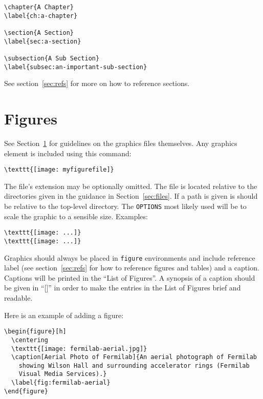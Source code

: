 \begin{verbatim}
\chapter{A Chapter}
\label{ch:a-chapter}

\section{A Section}
\label{sec:a-section}

\subsection{A Sub Section}
\label{subsec:an-important-sub-section}
\end{verbatim}

See section~\ref{sec:refs} for more on how to reference sections.


\section{Figures}
\label{sec:figures}

See Section~\ref{sec:figures} for guidelines on the graphics files themselves.
Any graphics element is included using this command:

\begin{verbatim}
\texttt{[image: myfigurefile]}
\end{verbatim}

The file's extension may be optionally omitted.
The file is located relative to the directories given in the guidance in Section~\ref{sec:files}.  If a path is given is should be relative to the top-level directory.
The \texttt{OPTIONS} most likely used will be to scale the graphic to
a sensible size.  Examples:

\begin{verbatim}
\texttt{[image: ...]}
\texttt{[image: ...]}
\end{verbatim}

Graphics should always be placed in \texttt{figure} environments and include reference label (see
section~\ref{sec:refs} for how to reference figures and tables) and a
caption.  Captions will be printed in the ``List of Figures''.  A
synopsis of a caption should be given in ``[]'' in order to make the
entries in the List of Figures brief and readable.  

Here is an example of adding a figure:
\begin{verbatim}
\begin{figure}[h]
  \centering
  \texttt{[image: fermilab-aerial.jpg]}
  \caption[Aerial Photo of Fermilab]{An aerial photograph of Fermilab
    showing Wilson Hall and surrounding accelerator rings (Fermilab
    Visual Media Services).}
  \label{fig:fermilab-aerial}
\end{figure}
\end{verbatim}

